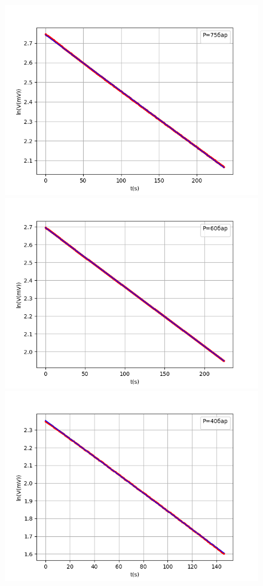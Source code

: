 \documentclass[a4paper,12pt]{article}
\theoremstyle{definition}
\begin{document}
\begin{enumerate}
\begin{figure}[h!]
	                \includegraphics[scale=0.542]{-0.002873.png}
	                \includegraphics[scale=0.542]{-0.003321.png}
	                \includegraphics[scale=0.542]{-0.005126.png}
				

\end{figure}
\end{enumerate}
\end{document}
